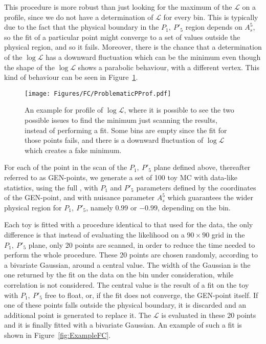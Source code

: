 This procedure is more robust than just looking for the maximum of the $\mathcal{L}$ on a profile, since we do not have a determination of $\mathcal{L}$ for every bin.
This is typically due to the fact that the physical boundary in the  $P_1,~P'_5$ region depends on $A_s^5$, so the fit of a particular point might converge to a set of values outside the physical region, and so it fails.
Moreover, there is the chance that a determination of the $\log\mathcal{L}$ has a downward fluctuation which can be the minimum even though the shape of the $\log\mathcal{L}$ shows a parabolic behaviour, with a different vertex.
This kind of behaviour can be seen in Figure~\ref{fig:ProblematicPProf}.

\begin{figure}
  \centering
  \texttt{[image: Figures/FC/ProblematicPProf.pdf]}
  \caption{An example for profile of $\log\mathcal{L}$, where it is possible to see the two possible issues to find the minimum just scanning the results, instead of performing a fit.
    Some bins are empty since the fit for those points fails, and there is a downward fluctuation of $\log\mathcal{L}$ which creates a fake minimum.}
  \label{fig:ProblematicPProf}
\end{figure}

For each of the point in the scan of the $P_1,~P'_5$ plane defined above, thereafter referred to as GEN-points, we generate a set of 100 toy MC with data-like statistics, using the full \pdf, with $P_1$ and $P'_5$ parameters defined by the coordinates of the GEN-point, and with nuisance parameter $A_s^5$ which guarantees the wider physical region for $P_1,~P'_5$, namely $0.99$ or $-0.99$, depending on the bin.

Each toy is fitted with a procedure identical to that used for the data, the only difference is that instead of evaluating the likelihood on a $90\times90$ grid in the $P_1,~P'_5$ plane, only 20 points are scanned, in order to reduce the time needed to perform the whole procedure.
These 20 points are chosen randomly, according to a bivariate Gaussian, around a central value.
The width of the Gaussian is the one returned by the fit on the data on the bin under consideration, while correlation is not considered.
The central value is the result of a fit on the toy with $P_1,~P'_5$ free to float, or, if the fit does not converge, the GEN-point itself.
If one of these points falls outside the physical boundary, it is discarded and an additional point is generated to replace it.
The $\mathcal{L}$ is evaluated in these 20 points and it is finally fitted with a bivariate Gaussian.
An example of such a fit is shown in Figure~\ref{fig:ExampleFC}.

